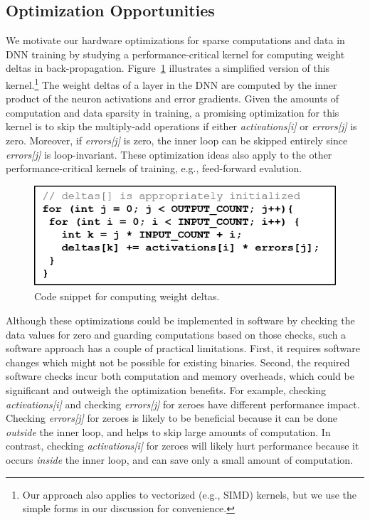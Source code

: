 \subsection{Optimization Opportunities}
\label{subsec:sparse_code_oppor}
We motivate our hardware optimizations for sparse computations and data in DNN training by studying a performance-critical kernel for computing weight deltas in back-propagation.  Figure~\ref{fig:deltas_source_code} illustrates a simplified version of this kernel.\footnote{Our approach also applies to vectorized (e.g., SIMD) kernels, but we use the simple forms in our discussion for convenience.}   The weight deltas of a layer in the DNN are computed by the inner product of the neuron activations and error gradients.  Given the amounts of computation and data sparsity in training, a promising optimization for this kernel is to skip the multiply-add operations if either \emph{activations[i]} or \emph{errors[j]} is zero.  Moreover,  if \emph{errors[j]} is zero, the inner loop can be skipped entirely since \emph{errors[j]} is loop-invariant. These optimization ideas also apply to the other performance-critical kernels of training, e.g., feed-forward evalution. 

\begin{figure}[h]
 \centering
 \includegraphics[width=.9\columnwidth]{Figures/deltas_source_code.png}
\caption{Code snippet for computing weight deltas.}
 \label{fig:deltas_source_code}
 \end{figure}

Although these optimizations could be implemented in software by checking the data values for zero and guarding computations based on those checks, such a software approach has a couple of practical limitations.   First, it requires software changes which might not be possible for existing binaries.   Second, the required software checks incur both computation and memory overheads, which could be significant and outweigh the optimization benefits.  For example, checking \emph{activations[i]} and checking \emph{errors[j]} for zeroes have different performance impact.  Checking \emph{errors[j]} for zeroes is likely to be beneficial because it can be done \emph{outside} the inner loop, and helps to skip large amounts of computation. In contrast, checking \emph{activations[i]} for zeroes will likely hurt performance because it occurs \emph{inside} the inner loop, and can save only a small amount of computation. 

